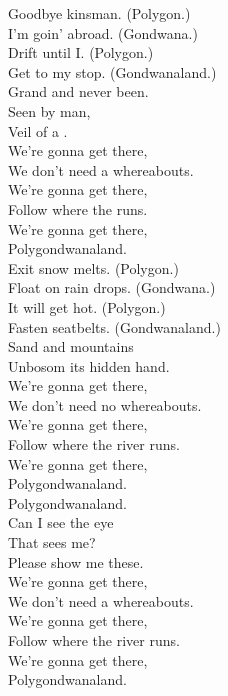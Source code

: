 


Goodbye kinsman. (Polygon.) \\
I'm goin' abroad. (Gondwana.) \\
Drift until I. (Polygon.) \\
Get to my stop. (Gondwanaland.) \\

Grand and never been. \\
Seen by man, \\
Veil of a . \\

We're gonna get there, \\
We don't need a whereabouts. \\
We're gonna get there, \\
Follow where the  runs. \\
We're gonna get there, \\
Polygondwanaland. \\

Exit snow melts. (Polygon.) \\
Float on rain drops. (Gondwana.) \\
It will get hot. (Polygon.) \\
Fasten seatbelts. (Gondwanaland.) \\

Sand and mountains \\
Unbosom its hidden hand. \\

We're gonna get there, \\
We don't need no whereabouts. \\
We're gonna get there, \\
Follow where the river runs. \\
We're gonna get there, \\
Polygondwanaland. \\

Polygondwanaland. \\
Can I see the eye \\
That sees me? \\
Please show me these. \\

We're gonna get there, \\
We don't need a whereabouts. \\
We're gonna get there, \\
Follow where the river runs. \\
We're gonna get there, \\
Polygondwanaland. \\

